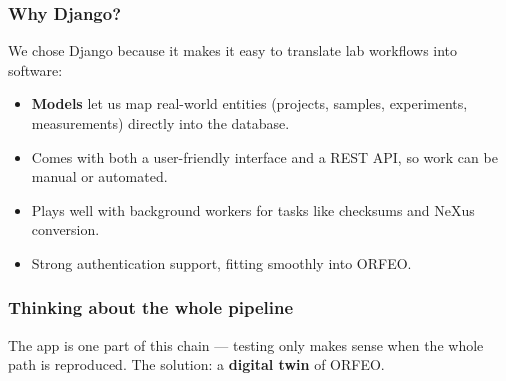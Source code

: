 \documentclass{beamer}
\begin{document}
	\begin{frame}
		\frametitle{Why Django?}
		
		We chose Django because it makes it easy to translate lab workflows into software:
		
		\begin{itemize}
			\item \textbf{Models} let us map real-world entities  
			(projects, samples, experiments, measurements) directly into the database.
			\item Comes with both a user-friendly interface and a REST API, so work can be manual or automated.
			\item Plays well with background workers for tasks like checksums and NeXus conversion.
			\item Strong authentication support, fitting smoothly into ORFEO.
		\end{itemize}
	\end{frame}
	
	\begin{frame}
		\frametitle{Thinking about the whole pipeline}
		
		\centering
		
		\vspace{1em}
		\small The app is one part of this chain — testing only makes sense when the whole path is reproduced.  
		The solution: a \textbf{digital twin} of ORFEO.
	\end{frame}
	
\end{document}
